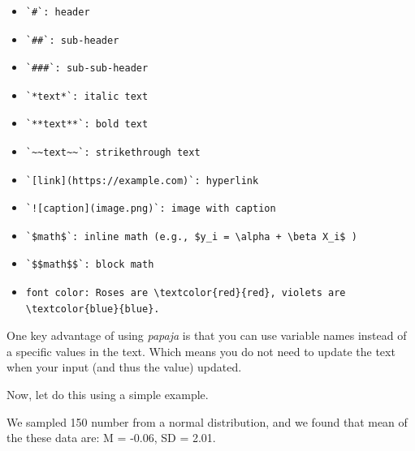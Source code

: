 \documentclass[
  man]{apa6}
\begin{document}
\begin{itemize}
\item
\begin{verbatim}
`#`: header
\end{verbatim}
\item
\begin{verbatim}
`##`: sub-header
\end{verbatim}
\item
\begin{verbatim}
`###`: sub-sub-header
\end{verbatim}
\item
\begin{verbatim}
`*text*`: italic text
\end{verbatim}
\item
\begin{verbatim}
`**text**`: bold text
\end{verbatim}
\item
\begin{verbatim}
`~~text~~`: strikethrough text
\end{verbatim}
\item
\begin{verbatim}
`[link](https://example.com)`: hyperlink
\end{verbatim}
\item
\begin{verbatim}
`![caption](image.png)`: image with caption
\end{verbatim}
\item
\begin{verbatim}
`$math$`: inline math (e.g., $y_i = \alpha + \beta X_i$ )
\end{verbatim}
\item
\begin{verbatim}
`$$math$$`: block math
\end{verbatim}
\item
\begin{verbatim}
font color: Roses are \textcolor{red}{red}, violets are \textcolor{blue}{blue}.
\end{verbatim}
\end{itemize}

One key advantage of using \emph{papaja} is that you can use variable names instead of a specific values in the text. Which means you do not need to update the text when your input (and thus the value) updated.

Now, let do this using a simple example.

We sampled 150 number from a normal distribution, and we found that mean of the these data are: M = -0.06, SD = 2.01.
\end{document}
